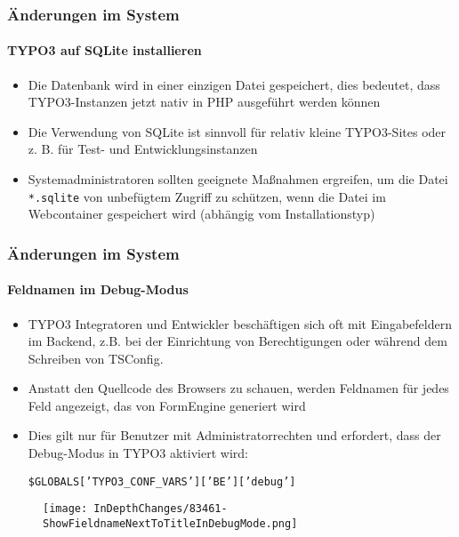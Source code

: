 \begin{frame}[fragile]
	\frametitle{Änderungen im System}
	\framesubtitle{TYPO3 auf SQLite installieren}

	\begin{itemize}
		\item Die Datenbank wird in einer einzigen Datei gespeichert, dies bedeutet, dass
			TYPO3-Instanzen jetzt nativ in PHP ausgeführt werden können
		\item Die Verwendung von SQLite ist sinnvoll für relativ kleine TYPO3-Sites
			 oder z. B. für Test- und Entwicklungsinstanzen
		\item Systemadministratoren sollten geeignete Maßnahmen ergreifen, um die Datei
			\texttt{*.sqlite} von unbefügtem Zugriff zu schützen, wenn die Datei im Webcontainer
			gespeichert wird (abhängig vom Installationstyp)
	\end{itemize}

\end{frame}


\begin{frame}[fragile]
	\frametitle{Änderungen im System}
	\framesubtitle{Feldnamen im Debug-Modus}

	\begin{itemize}

		\item TYPO3 Integratoren und Entwickler beschäftigen sich oft mit Eingabefeldern im Backend,
			z.B. bei der Einrichtung von Berechtigungen oder während dem Schreiben von TSConfig.

		\item Anstatt den Quellcode des Browsers zu schauen, werden Feldnamen 
			für jedes Feld angezeigt, das von 
			FormEngine generiert wird

		\item Dies gilt nur für Benutzer mit Administratorrechten und
			erfordert, dass der Debug-Modus in TYPO3 aktiviert wird:

			\smaller
				\texttt{\$GLOBALS['TYPO3\_CONF\_VARS']['BE']['debug']}
			\normalsize

	\end{itemize}

	\begin{figure}
		\texttt{[image: InDepthChanges/83461-ShowFieldnameNextToTitleInDebugMode.png]}
	\end{figure}

\end{frame}

